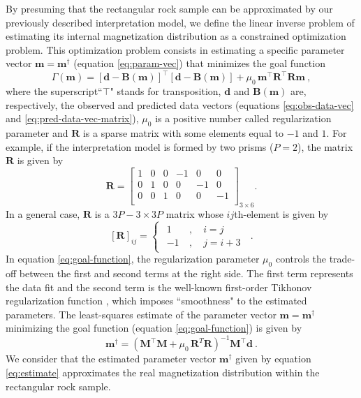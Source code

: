 \documentclass[galley,gc]{agutex}
\begin{document}
\begin{article}
By presuming that the rectangular rock sample can
be approximated by our previously described 
interpretation model, we define the linear inverse
problem of estimating its internal magnetization
distribution as a constrained optimization problem.
This optimization problem consists in 
estimating a specific parameter vector 
$\mathbf{m} = \mathbf{m}^{\dagger}$ (equation \ref{eq:param-vec}) 
that minimizes the goal function
\begin{equation}
\Gamma(\mathbf{m}) = \left[ 
\mathbf{d} - \mathbf{B}(\mathbf{m})
\right]^{\top}
\left[ 
\mathbf{d} - \mathbf{B}(\mathbf{m})
\right] + 
\mu_0 \, \mathbf{m}^{\top} \mathbf{R}^{\top}\mathbf{R} \mathbf{m} \: ,
\label{eq:goal-function}
\end{equation}
where the superscript``$\top$" stands for transposition, 
$\mathbf{d}$ and $\mathbf{B}(\mathbf{m})$ are,
respectively, the observed and predicted data vectors
(equations \ref{eq:obs-data-vec} and \ref{eq:pred-data-vec-matrix}),
$\mu_0$ is a positive number called regularization parameter and
$\mathbf{R}$ is a sparse matrix with some elements equal to $-1$ and $1$.
For example, if the interpretation model is formed by 
two prisms ($P=2$), the matrix $\mathbf{R}$ is given by
\begin{equation}
\mathbf{R} =\begin{bmatrix}
 1& 0 & 0 & -1 & 0 & 0\\ 
0& 1 & 0 & 0 & -1 & 0\\
 0& 0 & 1 & 0 & 0 & -1\\
\end{bmatrix}_{3 \times 6}.
\label{eq:matrix_smoothness}
\end{equation} 
In a general case, $\mathbf{R}$ is a $3P-3 \times 3P$ matrix
whose $ij$th-element is given by
\begin{equation}
\left[ \mathbf{R} \right]_{ij} = 
\begin{cases}
\begin{split}
1 &\: , \quad i = j \\
-1 &\: , \quad j = i+3
\end{split}
\end{cases} \: .
\label{eq:elements_matrix}
\end{equation}
In equation \ref{eq:goal-function}, the regularization parameter $\mu_0$ 
controls the trade-off between 
the first and second terms at the right side. 
The first term represents the data fit
and the second term is the well-known first-order Tikhonov regularization 
function \citep{aster2005}, which imposes
``smoothness" to the estimated parameters.
The least-squares estimate of the parameter vector 
$\mathbf{m} = \mathbf{m}^{\dagger}$ minimizing 
the goal function (equation \ref{eq:goal-function}) is given by
\begin{equation}
\mathbf{m}^{\dagger} = \left( \mathbf{M}^{\top}\mathbf{M} + \mu_0 \,  
\mathbf{R}^T \mathbf{R}\right)^{-1}
\mathbf{M}^{\top}\mathbf{d} \: .
\label{eq:estimate}
\end{equation}
We consider that the estimated parameter vector $\mathbf{m}^{\dagger}$
given by equation \ref{eq:estimate} approximates the real magnetization 
distribution within the rectangular rock sample.


\end{article}
\end{document}
